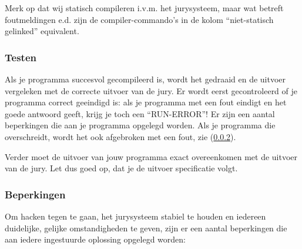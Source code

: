 \documentclass[11pt,titlepage,a4paper]{article}
\begin{document}
Merk op dat wij statisch compileren i.v.m. het jurysysteem, maar wat
betreft foutmeldingen e.d. zijn de compiler-commando's in de kolom
``niet-statisch gelinked'' equivalent.

\subsubsection{Testen}

Als je programma succesvol gecompileerd is, wordt het gedraaid en de
uitvoer vergeleken met de correcte uitvoer van de jury. Er wordt eerst
gecontroleerd of je programma correct geeindigd is: als je programma
met een fout eindigt en het goede antwoord geeft, krijg je toch een
``RUN-ERROR''! Er zijn een aantal beperkingen die aan je programma
opgelegd worden. Als je programma die overschreidt, wordt het ook
afgebroken met een fout, zie (\ref{runlimits}).

Verder moet de uitvoer van jouw programma exact overeenkomen met de
uitvoer van de jury. Let dus goed op, dat je de uitvoer specificatie
volgt.

\subsubsection{Beperkingen}\label{runlimits}

Om hacken tegen te gaan, het jurysysteem stabiel te houden en iedereen
duidelijke, gelijke omstandigheden te geven, zijn er een aantal
beperkingen die aan iedere ingestuurde oplossing opgelegd worden:
\end{document}
